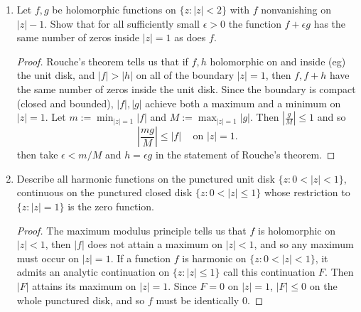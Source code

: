 \documentclass{article}
\begin{document}
\begin{enumerate}
\begin{proof}
	The same computation shows that 
	\[ \left | \int_{C^+_{\epsilon}} f(z) dz \right | \leq \pi \epsilon^{5/4}/(\epsilon^2+1)\]
	as $\epsilon \rightarrow 0$, the numerator vanishes and the denominator $\rightarrow 1$.
	So
	\[ \pi i^{1/4} = \int_{\gamma_{\infty, 0}} f(z) dz = \int_{-\infty}^0 f dz + \int_0^\infty f dz \]
	A change of variables gives us 
	\[ \int_{-\infty}^0 f(z) dz = \int_{\infty}^0 f(-z) (-1) dz = \int_0^\infty f(-z) dz.\]
	But $f(-z) = (-1)^{1/4} f(z)$ so we get 
	\[ \pi i^{1/4} = \left ( (-1)^{1/4} _1 \right ) \int_0^\infty f(z) dz \]
	so 
	\begin{align*}
		\int_0^\infty f(z) dz = \pi i^{1/4}/ ((-1)^1/4 + 1) &= \pi \frac{i^{1/4}}{i^{1/2} +1}\\
		&=\pi/(i^{1/4} + i^{-1/4})
	\end{align*}
	But note that 
	\[i^{1/4} = \cos (\pi/8) + i \sin (\frac{\pi}{8})\]
	\[i^{-1/4} = \cos (\pi/8) - i \sin (\pi/8) \]
	so
	\[ \int_0^\infty f(z) dz = \boxed{\frac{\pi}{2 \cos(\pi/8)}}\]
	
	\end{proof}
	
	\item Let $f, g$ be holomorphic functions on $\{z : |z| < 2\}$ with $f$ nonvanishing on $|z| - 1$. 
	Show that for all sufficiently small $\epsilon > 0$ the function $f + \epsilon g$ has the same number of zeros inside $|z| = 1$ 
	as does $f$.
	
	\begin{proof}
	Rouche's theorem tells us that if $f,h$ holomorphic on and inside (eg) the unit disk, and $|f|>|h|$ on
	all of the boundary $|z|=1$, then $f, f+h$ have the same number of zeros inside the unit disk.
	Since the boundary is compact (closed and bounded), $|f|,|g|$ achieve both a maximum and a 
	minimum on $|z|=1$. Let $m:= \min_{|z|=1} |f|$ and $M:= \max_{|z|=1} |g|$. Then $|\frac{g}{M}| \leq 1$
	and so 
	\[ \left | \frac{mg}{M} \right | \leq |f| \;\;\; \text{ on } |z|=1.\]
	then take $\epsilon < m/M$ and $h = \epsilon g$ in the statement of Rouche's theorem.
	\end{proof}
	
	\item Describe all harmonic functions on the punctured unit disk $\{z : 0 < |z| < 1\}$, continuous on the punctured closed disk
	$\{z: 0 < |z| \leq 1\}$ whose restriction to $\{z: |z| = 1\}$ is the zero function.
	
	\begin{proof}
		The maximum modulus principle tells us that $f$ is holomorphic on $|z|<1$, then $|f|$ does not 
		attain a maximum on $|z| < 1$, and so any maximum must occur on $|z| = 1$. If a function $f$
		is harmonic on $\{z: 0 < |z| < 1\}$, it admits an analytic continuation on $\{z: |z| \leq 1\}$ 
		call this continuation $F$. Then $|F|$ attains its maximum on $|z|=1$. Since $F=0$ on $|z|=1$,
		$|F| \leq 0$ on the whole punctured disk, and so $f$ must be identically $0$.
	\end{proof}
	

\end{enumerate}
\end{document}
